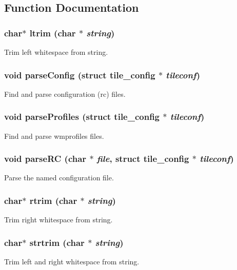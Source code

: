 \subsection{Function Documentation}
\subsubsection{\setlength{\rightskip}{0pt plus 5cm}char$\ast$ ltrim (char $\ast$ {\em string})}\label{tilerc_8c_a4}


Trim left whitespace from string. 

\subsubsection{\setlength{\rightskip}{0pt plus 5cm}void parse\-Config (struct {\bf tile\_\-config} $\ast$ {\em tileconf})}\label{tilerc_8c_a1}


Find and parse configuration (rc) files. 

\subsubsection{\setlength{\rightskip}{0pt plus 5cm}void parse\-Profiles (struct {\bf tile\_\-config} $\ast$ {\em tileconf})}\label{tilerc_8c_a2}


Find and parse wmprofiles files. 

\subsubsection{\setlength{\rightskip}{0pt plus 5cm}void parse\-RC (char $\ast$ {\em file}, struct {\bf tile\_\-config} $\ast$ {\em tileconf})}\label{tilerc_8c_a0}


Parse the named configuration file. 

\subsubsection{\setlength{\rightskip}{0pt plus 5cm}char$\ast$ rtrim (char $\ast$ {\em string})}\label{tilerc_8c_a5}


Trim right whitespace from string. 

\subsubsection{\setlength{\rightskip}{0pt plus 5cm}char$\ast$ strtrim (char $\ast$ {\em string})}\label{tilerc_8c_a3}


Trim left and right whitespace from string. 

